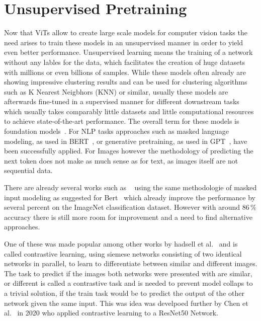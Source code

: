 \section{Unsupervised Pretraining}\label{sec:unsupervised-pretraining}
Now that ViTs allow to create large scale models for computer vision tasks the need arises to train these models in an unsupervised manner in order to yield even better performance.
Unsupervised learning means the training of a network without any lables for the data, which facilitates the creation of huge datasets with millions or even billions of samples.
While these models often already are showing impressive clustering results and can be used for clustering algorithms such as K Nearest Neigbhors (KNN) or similar, usually these models are afterwards fine-tuned in a supervised manner for different downstream tasks which usually takes comparably little datasets and little computational resources to achieve state-of-the-art performance.
The overall term for these models is foundation models~\cite{Bommasani2021}.
For NLP tasks approaches such as masked language modeling, as used in BERT~\cite{Devlin2018}, or generative pretraining, as used in GPT~\cite{Radford2018}, have been successfully applied.
For Images however the methodology of predicting the next token does not make as much sense as for text, as images itself are not sequential data.

There are already several works such as ~\cite{Wei2022,Bao2021} using the same methodologie of masked input modeling as suggested for Bert~\cite{Devlin2018} which already improve the performance by several percent on the ImageNet classification dataset.
However with around $86\,\%$ accuracy there is still more room for improvement and a need to find alternative approaches.

One of these was made popular among other works by hadsell et al.~\cite{Hadsell2006} and is called contrastive learning, using siemese networks consisting of two identical networks in parallel, to learn to differentiate between similar and different images. The task to predict if the images both networks were presented with are similar, or different is called a contrastive task and is needed to prevent model collaps to a trivial solution, if the train task would be to predict the output of the other network given the same input.
This was idea was develpoed further by Chen et al.~\cite{Chen2020} in 2020 who applied contrastive learning to a ResNet50 Network.

